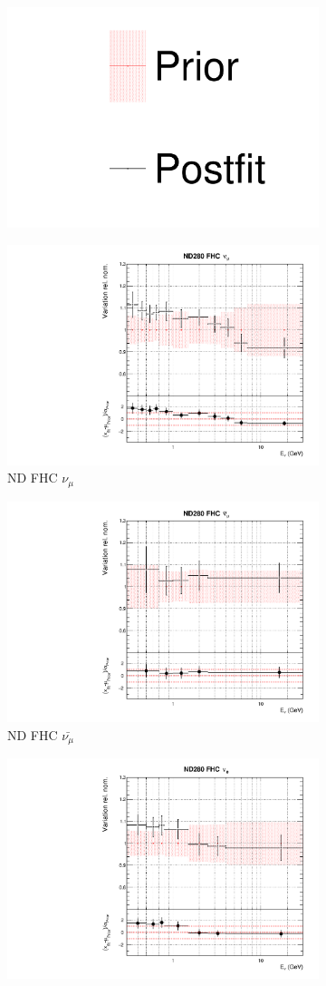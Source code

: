 \begin{figure}
\centering
\begin{subfigure}{0.8\textwidth}
  \centering
  \includegraphics[width=0.24\linewidth]{figs/dat_leg}
\end{subfigure}
\begin{subfigure}{0.45\textwidth}
  \centering
  \includegraphics[width=0.75\linewidth]{figs/datflux0}
  \caption{ND FHC $\nu_{\mu}$}
\end{subfigure}
\begin{subfigure}{0.45\textwidth}
  \centering
  \includegraphics[width=0.75\linewidth]{figs/datflux1}
  \caption{ND FHC $\bar{\nu_{\mu}}$}
\end{subfigure}
\begin{subfigure}{0.45\textwidth}
  \centering
  \includegraphics[width=0.75\linewidth]{figs/datflux2}

\end{subfigure}
\end{figure}
